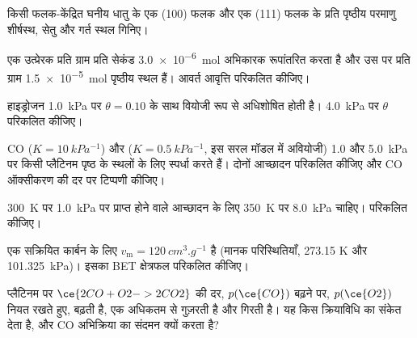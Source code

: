 \begin{exercise}[$\star$]\label{exo:b3:surfaces-catalysis:3}
किसी फलक-केंद्रित घनीय धातु के एक (100) फलक और एक (111) फलक के प्रति पृष्ठीय परमाणु
शीर्षस्थ, सेतु और गर्त स्थल गिनिए।
\end{exercise}

\begin{exercise}[$\star$]\label{exo:b3:surfaces-catalysis:4}
एक उत्प्रेरक प्रति ग्राम प्रति सेकंड \qty{3.0e-6}{mol} अभिकारक रूपांतरित करता है और उस पर
प्रति ग्राम \qty{1.5e-5}{mol} पृष्ठीय स्थल हैं। आवर्त आवृत्ति परिकलित कीजिए।
\end{exercise}

\begin{exercise}[$\star\star$]\label{exo:b3:surfaces-catalysis:5}
हाइड्रोजन \qty{1.0}{kPa} पर $\theta = 0.10$ के साथ वियोजी रूप से अधिशोषित होती है। \qty{4.0}{kPa} पर $\theta$ परिकलित कीजिए।
\end{exercise}

\begin{exercise}[$\star\star$]\label{exo:b3:surfaces-catalysis:6}
CO ($K = \qty{10}{kPa^{-1}}$) और  ($K = \qty{0.5}{kPa^{-1}}$, इस सरल मॉडल में अवियोजी)
1.0 और \qty{5.0}{kPa} पर किसी प्लैटिनम पृष्ठ के स्थलों के लिए स्पर्धा करते हैं। दोनों
आच्छादन परिकलित कीजिए और CO ऑक्सीकरण की दर पर टिप्पणी कीजिए।
\end{exercise}

\begin{exercise}[$\star\star$]\label{exo:b3:surfaces-catalysis:7}
\qty{300}{K} पर \qty{1.0}{kPa} पर प्राप्त होने वाले आच्छादन के लिए \qty{350}{K} पर \qty{8.0}{kPa} चाहिए।  परिकलित कीजिए।
\end{exercise}

\begin{exercise}[$\star\star$]\label{exo:b3:surfaces-catalysis:8}
एक सक्रियित कार्बन के लिए $v_{\mathrm m} = \qty{120}{cm^3.g^{-1}}$ है (मानक परिस्थितियाँ, 273.15 K और
\qty{101.325}{kPa})। इसका BET क्षेत्रफल परिकलित कीजिए।
\end{exercise}

\begin{exercise}[$\star\star$]\label{exo:b3:surfaces-catalysis:9}
प्लैटिनम पर $\ce{2 CO + O2 -> 2 CO2}$ की दर, $p(\ce{CO})$ बढ़ने पर, $p(\ce{O2})$ नियत रखते हुए,
बढ़ती है, एक अधिकतम से गुज़रती है और गिरती है। यह किस क्रियाविधि का संकेत देता है, और CO
अभिक्रिया का संदमन क्यों करता है?
\end{exercise}

